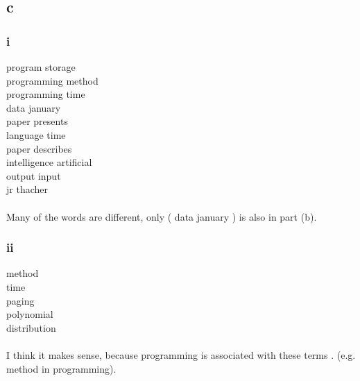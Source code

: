 \subsection{c}
\subsubsection{i}
program storage \\
programming method \\
programming time\\
data january \\
paper presents \\
language time \\
paper describes \\
intelligence artificial \\
output input \\
jr thacher \\
\\
Many of the words are different, only ( data january ) is also in part (b).

\subsubsection{ii}
method\\
time \\
paging \\
polynomial \\
distribution \\
\\
I think it makes sense, because programming is associated with these terms . (e.g. method in programming).


